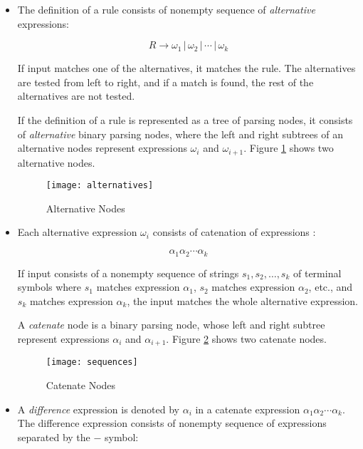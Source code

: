 \documentclass[a4paper,oneside,11pt]{book}
\theoremstyle{definition}
\begin{document}
\begin{itemize}

\item
The definition of a rule consists of nonempty sequence of \emph{alternative} expressions:

$$R \rightarrow \omega_1 \, | \, \omega_2 \, | \, \cdots \, | \, \omega_k$$

If input matches one of the alternatives, it matches the rule.
The alternatives are tested from left to right, and if a match is found, the rest of the alternatives are not tested.

If the definition of a rule is represented as a tree of parsing nodes, it consists of \emph{alternative} binary parsing nodes,
where the left and right subtrees of an alternative nodes represent expressions $\omega_i$ and $\omega_{i + 1}$.
Figure \ref{fig:alternatives} shows two alternative nodes.

\begin{figure}[htb]
\caption{Alternative Nodes}
\label{fig:alternatives}
\vspace{0.5cm}
\begin{center}
\texttt{[image: alternatives]}
\end{center}
\end{figure}

\item
Each alternative expression $\omega_i$ consists of catenation of expressions :

$$\alpha_1 \alpha_2 \cdots \alpha_k$$

If input consists of a nonempty sequence of strings $s_1, s_2, \ldots, s_k$ of terminal symbols where $s_1$ matches expression $\alpha_1$,
$s_2$ matches expression $\alpha_2$, etc., and $s_k$ matches expression $\alpha_k$,
the input matches the whole alternative expression.

A \emph{catenate} node is a binary parsing node, whose left and right subtree represent expressions $\alpha_i$ and $\alpha_{i + 1}$.
Figure \ref{fig:catenate} shows two catenate nodes.

\begin{figure}[htb]
\caption{Catenate Nodes}
\label{fig:catenate}
\vspace{0.5cm}
\begin{center}
\texttt{[image: sequences]}
\end{center}
\end{figure}

\item
A \emph{difference} expression is denoted by $\alpha_i$ in a catenate expression $\alpha_1 \alpha_2 \cdots \alpha_k$.
The difference expression consists of nonempty sequence of expressions separated by the $-$ symbol:


\end{itemize}
\end{document}
